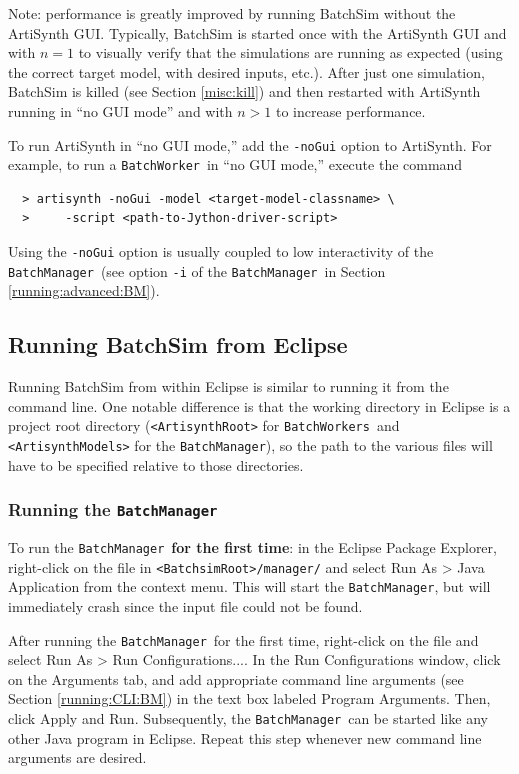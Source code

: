 \documentclass{article}
\newcommand{\AS}{<ArtisynthRoot>}
\newcommand{\AM}{<ArtisynthModels>}
\newcommand{\BS}{<BatchsimRoot>}
\newcommand{\BM}{{\tt BatchManager}}
\newcommand{\BW}{{\tt BatchWorker}}
\newcommand{\BWs}{{\tt BatchWorkers}}
\begin{document}
\begin{sideblock}
Note: performance is greatly improved by running BatchSim without the ArtiSynth GUI. Typically, BatchSim is started once with the ArtiSynth GUI and with $n = 1$ to visually verify that the simulations are running as expected (using the correct target model, with desired inputs, etc.). After just one simulation, BatchSim is killed (see Section \ref{misc:kill}) and then restarted with ArtiSynth running in ``no GUI mode'' and with $n > 1$ to increase performance.

To run ArtiSynth in ``no GUI mode,'' add the {\tt -noGui} option to ArtiSynth. For example, to run a \BW\ in ``no GUI mode,'' execute the command
\begin{verbatim}
  > artisynth -noGui -model <target-model-classname> \
  >     -script <path-to-Jython-driver-script>
\end{verbatim}

Using the {\tt -noGui} option is usually coupled to low interactivity of the \BM\ (see option {\tt -i} of the \BM\ in Section \ref{running:advanced:BM}).
\end{sideblock}

\subsection{Running BatchSim from Eclipse}
\label{running:eclipse}

Running BatchSim from within Eclipse is similar to running it from the command line. One notable difference is that the working directory in Eclipse is a project root directory ({\tt \AS} for \BWs\ and {\tt \AM} for the \BM), so the path to the various files will have to be specified relative to those directories.

\subsubsection{Running the \BM}

To run the \BM\ \textbf{for the first time}: in the Eclipse {\sf Package Explorer}, right-click on the  file in {\tt \BS/manager/} and select {\sf Run As > Java Application} from the context menu. This will start the \BM, but will immediately crash since the input file could not be found.

After running the \BM\ for the first time, right-click on the  file and select {\sf Run As > Run Configurations...}. In the {\sf Run Configurations} window, click on the {\sf Arguments} tab, and add appropriate command line arguments (see Section \ref{running:CLI:BM}) in the text box labeled {\sf Program Arguments}. Then, click {\sf Apply} and {\sf Run}. Subsequently, the \BM\ can be started like any other Java program in Eclipse. Repeat this step whenever new command line arguments are desired.
\end{document}
